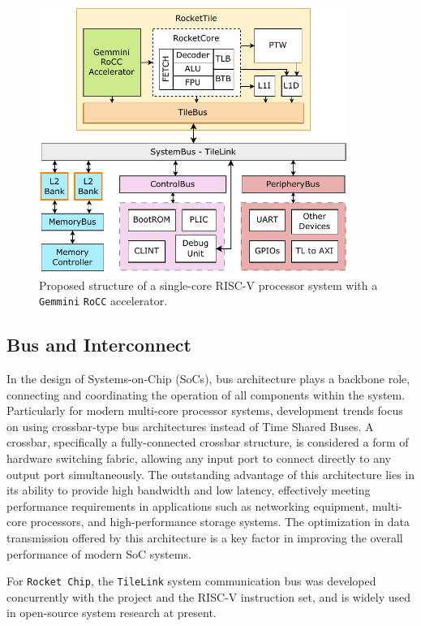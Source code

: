 \begin{figure}[h!]
    \centering
    \includegraphics[width=0.9\textwidth]{Images/RocketChip_Gemmini_Diagram.pdf}
    \caption{Proposed structure of a single-core RISC-V processor system with a \texttt{Gemmini} \texttt{RoCC} accelerator.}
    \label{fig:single_core_gemmini_system}
\end{figure}

\subsection{Bus and Interconnect}
\label{subsec:bus_interconnect}

In the design of Systems-on-Chip (SoCs), bus architecture plays a backbone role, connecting and coordinating the operation of all components within the system. Particularly for modern multi-core processor systems, development trends focus on using crossbar-type bus architectures instead of Time Shared Buses. A crossbar, specifically a fully-connected crossbar structure, is considered a form of hardware switching fabric, allowing any input port to connect directly to any output port simultaneously. The outstanding advantage of this architecture lies in its ability to provide high bandwidth and low latency, effectively meeting performance requirements in applications such as networking equipment, multi-core processors, and high-performance storage systems. The optimization in data transmission offered by this architecture is a key factor in improving the overall performance of modern SoC systems.

For \texttt{Rocket Chip}, the \texttt{TileLink} \cite{sifive2018tilelink} system communication bus was developed concurrently with the project and the RISC-V instruction set, and is widely used in open-source system research at present.


